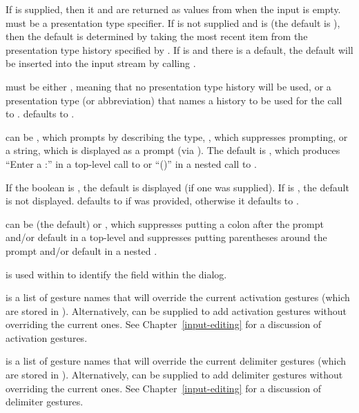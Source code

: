 If  is supplied, then it and  are returned as
values from  when the input is empty.  
must be a presentation type specifier.  If  is not supplied and
 is  (the default is ), then the
default is determined by taking the most recent item from the presentation type
history specified by .  If  is  and
there is a default, the default will be inserted into the input stream by
calling .

 must be either , meaning that no presentation type history
will be used, or a presentation type (or abbreviation) that names a history to
be used for the call to .   defaults to .

 can be , which prompts by describing the type, ,
which suppresses prompting, or a string, which is displayed as a prompt (via
).  The default is , which produces ``Enter a
:'' in a top-level call to  or ``()'' in a nested
call to .

If the boolean  is , the default is displayed
(if one was supplied).  If  is , the default is
not displayed.   defaults to  if 
was provided, otherwise it defaults to .

 can be  (the default) or , which
suppresses putting a colon after the prompt and/or default in a top-level
 and suppresses putting parentheses around the prompt and/or default
in a nested .

 is used within  to identify the
field within the dialog.

 is a list of gesture names that will override the
current activation gestures (which are stored in ).
Alternatively,  can be supplied to add
activation gestures without overriding the current ones.  See
Chapter~\ref{input-editing} for a discussion of activation gestures.

 is a list of gesture names that will override the
current delimiter gestures (which are stored in ).
Alternatively,  can be supplied to add
delimiter gestures without overriding the current ones.  See
Chapter~\ref{input-editing} for a discussion of delimiter gestures.


